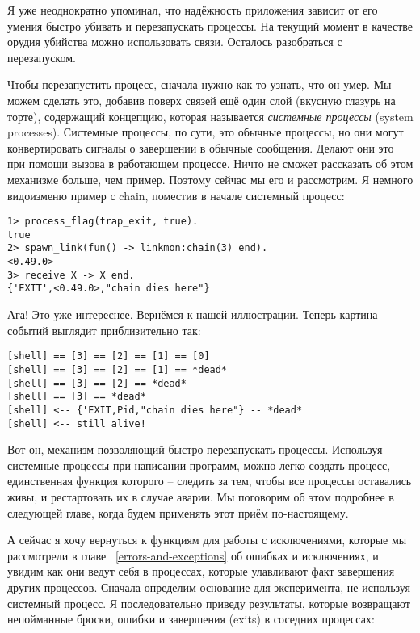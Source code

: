 Я уже неоднократно упоминал, что надёжность приложения зависит от его умения быстро убивать и перезапускать процессы.
На текущий момент в качестве орудия убийства можно использовать связи.
Осталось разобраться с перезапуском.

Чтобы перезапустить процесс, сначала нужно как\--то узнать, что он умер.
Мы можем сделать это, добавив поверх связей ещё один слой (вкусную глазурь на торте), содержащий концепцию, которая называется \emph{системные процессы} (system processes).
Системные процессы, по сути, это обычные процессы, но они могут конвертировать сигналы о завершении в обычные сообщения.
Делают они это при помощи вызова  в работающем процессе.
Ничто не сможет рассказать об этом механизме больше, чем пример.
Поэтому сейчас мы его и рассмотрим.
Я немного видоизменю пример с chain, поместив в начале системный процесс:
\begin{lstlisting}[style=erlang]
1> process_flag(trap_exit, true).
true
2> spawn_link(fun() -> linkmon:chain(3) end).
<0.49.0>
3> receive X -> X end.
{'EXIT',<0.49.0>,"chain dies here"}
\end{lstlisting}

Ага!
Это уже интереснее.
Вернёмся к нашей иллюстрации.
Теперь картина событий выглядит приблизительно так:
\begin{lstlisting}[style=erlang]
[shell] == [3] == [2] == [1] == [0]
[shell] == [3] == [2] == [1] == *dead*
[shell] == [3] == [2] == *dead*
[shell] == [3] == *dead*
[shell] <-- {'EXIT,Pid,"chain dies here"} -- *dead*
[shell] <-- still alive!
\end{lstlisting}

Вот он, механизм позволяющий быстро перезапускать процессы.
Используя системные процессы при написании программ, можно легко создать процесс, единственная функция которого \--- следить за тем, чтобы все процессы оставались живы, и рестартовать их в случае аварии.
Мы поговорим об этом подробнее в следующей главе, когда будем применять этот приём по\--настоящему.

А сейчас я хочу вернуться к функциям для работы с исключениями, которые мы рассмотрели в главе ~\ref{errors-and-exceptions} об ошибках и исключениях, и увидим как они ведут себя в процессах, которые улавливают факт завершения других процессов.
Сначала  определим основание для эксперимента, не используя системный процесс.
Я последовательно приведу результаты, которые возвращают непойманные броски, ошибки и завершения (exits) в соседних процессах:

